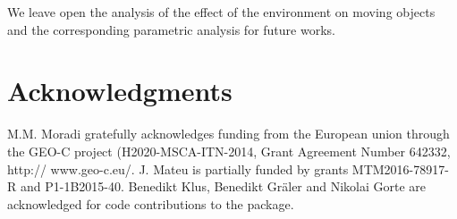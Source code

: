 \documentclass[article]{jss}
\begin{document}
  We leave open the analysis of the effect of the environment on moving objects and the corresponding parametric analysis for future works.
  
\section*{Acknowledgments}

M.M. Moradi  gratefully acknowledges funding from the European union through the GEO-C project (H2020-MSCA-ITN-2014, Grant Agreement Number 642332, http:// www.geo-c.eu/. J. Mateu is partially funded by grants MTM2016-78917-R and P1-1B2015-40. Benedikt Klus, Benedikt Gr\"{a}ler and Nikolai Gorte are acknowledged for code contributions to the  package.








\end{document}

